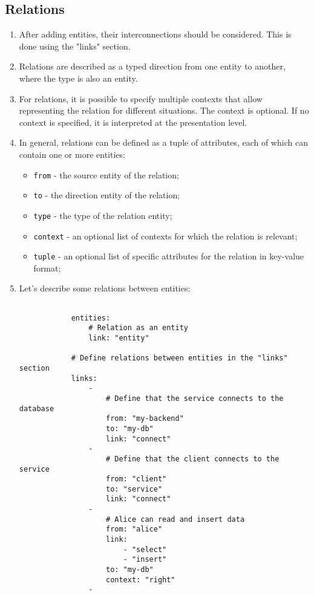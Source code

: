 \documentclass[final]{article}
\begin{document}
    \subsection{Relations}
        \begin{enumerate}

            \item After adding entities, their interconnections should be considered.
            This is done using the "links" section.

            \item Relations are described as a typed direction from one entity 
            to another, where the type is also an entity.

            \item For relations, it is possible to specify multiple contexts 
            that allow representing the relation for different situations. The 
            context is optional. If no context is specified, it is interpreted 
            at the presentation level.

            \item In general, relations can be defined as a tuple of attributes, 
            each of which can contain one or more entities:

            \begin{itemize}
                \item \texttt{from} - the source entity of the relation;
                \item \texttt{to} - the direction entity of the relation;
                \item \texttt{type} - the type of the relation entity;
                \item \texttt{context} - an optional list of contexts for which the relation is relevant;
                \item \texttt{tuple} - an optional list of specific attributes for the relation in key-value format;
            \end{itemize}

            \item Let's describe some relations between entities:

            \begin{verbatim}

            entities:
                # Relation as an entity
                link: "entity"

            # Define relations between entities in the "links" section
            links:
                -
                    # Define that the service connects to the database
                    from: "my-backend"
                    to: "my-db"
                    link: "connect"
                -
                    # Define that the client connects to the service
                    from: "client"
                    to: "service"
                    link: "connect"
                -
                    # Alice can read and insert data
                    from: "alice"
                    link:
                        - "select"
                        - "insert"
                    to: "my-db"
                    context: "right"
                -


\end{verbatim}
\end{enumerate}
\end{document}
